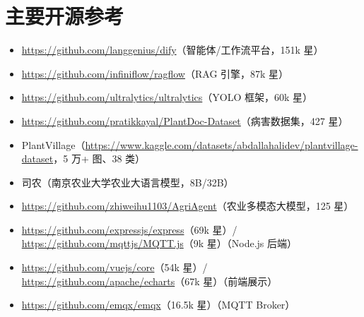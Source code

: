 \documentclass[11pt]{ctexart}
\begin{document}
\section{主要开源参考}
\begin{itemize}
  \item \url{https://github.com/langgenius/dify}（智能体/工作流平台，151k 星）
  \item \url{https://github.com/infiniflow/ragflow}（RAG 引擎，87k 星）
  \item \url{https://github.com/ultralytics/ultralytics}（YOLO 框架，60k 星）
  \item \url{https://github.com/pratikkayal/PlantDoc-Dataset}（病害数据集，427 星）
  \item PlantVillage（\url{https://www.kaggle.com/datasets/abdallahalidev/plantvillage-dataset}，5 万+ 图、38 类）
  \item 司农（南京农业大学农业大语言模型，8B/32B）
  \item \url{https://github.com/zhiweihu1103/AgriAgent}（农业多模态大模型，125 星）
  \item \url{https://github.com/expressjs/express}（69k 星）/ \url{https://github.com/mqttjs/MQTT.js}（9k 星）（Node.js 后端）
  \item \url{https://github.com/vuejs/core}（54k 星）/ \url{https://github.com/apache/echarts}（67k 星）（前端展示）
  \item \url{https://github.com/emqx/emqx}（16.5k 星）（MQTT Broker）
\end{itemize}
\end{document}

